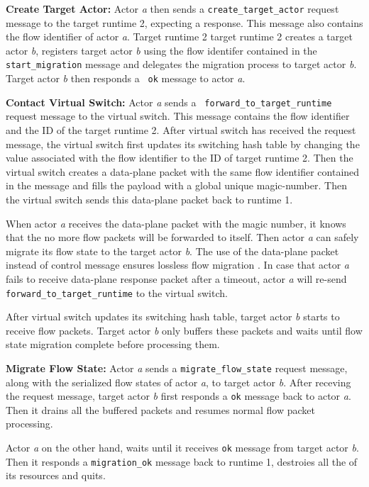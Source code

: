 \textbf{Create Target Actor:} Actor \textit{a} then sends a {\tt create\_target\_actor} request message to the
target runtime 2, expecting a response. This message also contains the flow
identifier of actor \textit{a}. Target runtime 2 target runtime 2 creates a target
actor \textit{b}, registers target actor \textit{b} using the flow identifer
contained in the {\tt start\_migration} message and delegates the migration
process to target actor \textit{b}. Target actor \textit{b} then responds a {\tt
ok} message to actor \textit{a}.

\textbf{Contact Virtual Switch:} Actor \textit{a} sends a {\tt
forward\_to\_target\_runtime} request message to the virtual switch. This
message contains the flow identifier and the ID of the target runtime 2. After
virtual switch has received the request message, the virtual switch first
updates its switching hash table by changing the value associated with the flow identifier
to the ID of target runtime 2. Then the virtual switch creates a data-plane
packet with the same flow identifier contained in the message and fills the
payload with a global unique magic-number. Then the virtual switch sends this
data-plane packet back to runtime 1.

When actor \textit{a} receives the data-plane packet with the magic number, it
knows that the no more flow packets will be forwarded to itself. Then actor
\textit{a} can safely migrate its flow state to the target actor \textit{b}. The
use of the data-plane packet instead of control message ensures lossless flow
migration \cite{gember2015opennf}. In case that actor \textit{a} fails to
receive data-plane response packet after a timeout, actor \textit{a} will
re-send {\tt forward\_to\_target\_runtime} to the virtual switch.

After virtual switch updates its switching hash table, target actor \textit{b}
starts to receive flow packets. Target actor \textit{b} only buffers these
packets and waits until flow state migration complete before processing them.

\textbf{Migrate Flow State:} Actor \textit{a} sends a {\tt migrate\_flow\_state}
request message, along with the serialized flow states of actor \textit{a}, to
target actor \textit{b}. After receving the request message, target actor
\textit{b} first responds a {\tt ok} message back to actor \textit{a}.
Then it drains all the buffered packets and resumes normal flow packet
processing. 

Actor \textit{a} on the other hand, waits until it receives {\tt ok} message
from target actor \textit{b}. Then it responds a {\tt migration\_ok} message
back to runtime 1, destroies all the of its resources and quits.

